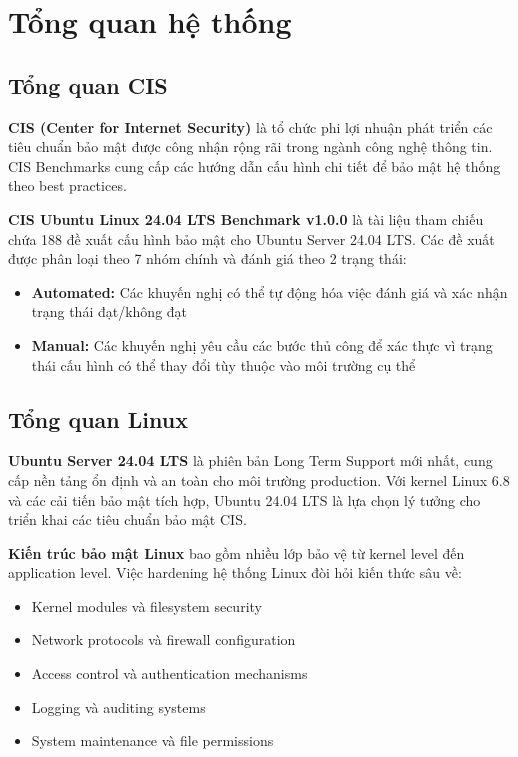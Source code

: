 \chapter{Tổng quan hệ thống}

\section{Tổng quan CIS}
\noindent \textbf{CIS (Center for Internet Security)} là tổ chức phi lợi nhuận phát triển các tiêu chuẩn bảo mật được công nhận rộng rãi trong ngành công nghệ thông tin. CIS Benchmarks cung cấp các hướng dẫn cấu hình chi tiết để bảo mật hệ thống theo best practices.

\noindent \textbf{CIS Ubuntu Linux 24.04 LTS Benchmark v1.0.0} là tài liệu tham chiếu chứa 188 đề xuất cấu hình bảo mật cho Ubuntu Server 24.04 LTS. Các đề xuất được phân loại theo 7 nhóm chính và đánh giá theo 2 trạng thái:

\begin{itemize}
\item \textbf{Automated:} Các khuyến nghị có thể tự động hóa việc đánh giá và xác nhận trạng thái đạt/không đạt
\item \textbf{Manual:} Các khuyến nghị yêu cầu các bước thủ công để xác thực vì trạng thái cấu hình có thể thay đổi tùy thuộc vào môi trường cụ thể
\end{itemize}

\section{Tổng quan Linux}
\noindent \textbf{Ubuntu Server 24.04 LTS} là phiên bản Long Term Support mới nhất, cung cấp nền tảng ổn định và an toàn cho môi trường production. Với kernel Linux 6.8 và các cải tiến bảo mật tích hợp, Ubuntu 24.04 LTS là lựa chọn lý tưởng cho triển khai các tiêu chuẩn bảo mật CIS.

\noindent \textbf{Kiến trúc bảo mật Linux} bao gồm nhiều lớp bảo vệ từ kernel level đến application level. Việc hardening hệ thống Linux đòi hỏi kiến thức sâu về:
\begin{itemize}
\item Kernel modules và filesystem security
\item Network protocols và firewall configuration
\item Access control và authentication mechanisms
\item Logging và auditing systems
\item System maintenance và file permissions
\end{itemize}

